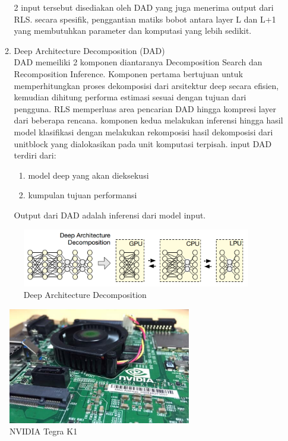 \begin{enumerate}
\begin{enumerate}
		2 input tersebut disediakan oleh DAD yang juga menerima output dari RLS. secara spesifik, penggantian matiks bobot antara layer L dan L+1 yang membutuhkan parameter dan komputasi yang lebih sedikit.
		\item Deep Architecture Decomposition (DAD)\\
		DAD memeiliki 2 komponen diantaranya Decomposition Search dan Recomposition Inference. Komponen pertama bertujuan untuk memperhitungkan proses dekomposisi dari arsitektur deep secara efisien, kemudian dihitung performa estimasi sesuai dengan tujuan dari pengguna. RLS memperluas area pencarian DAD hingga kompresi layer dari beberapa rencana. komponen kedua melakukan inferensi hingga hasil model klasifikasi dengan melakukan rekomposisi hasil dekomposisi dari unitblock yang dialokasikan pada unit komputasi terpisah. input DAD terdiri dari:
		\begin{enumerate}
			\item model deep yang akan dieksekusi
			\item kumpulan tujuan performansi
		\end{enumerate}
		Output dari DAD adalah inferensi dari model input.		
	\end{enumerate}
\begin{figure}[htp]
	\centering
	\includegraphics[width=10cm]{pics/dad}
	\caption{Deep Architecture Decomposition}
	\label{fig:dad}
\end{figure}
\end{enumerate}
\begin{figure}[htp]
	\centering
	\includegraphics[width=8cm]{pics/tegra_k1}
	\caption{NVIDIA Tegra K1}
	\label{fig:tegra_k1}
\end{figure}